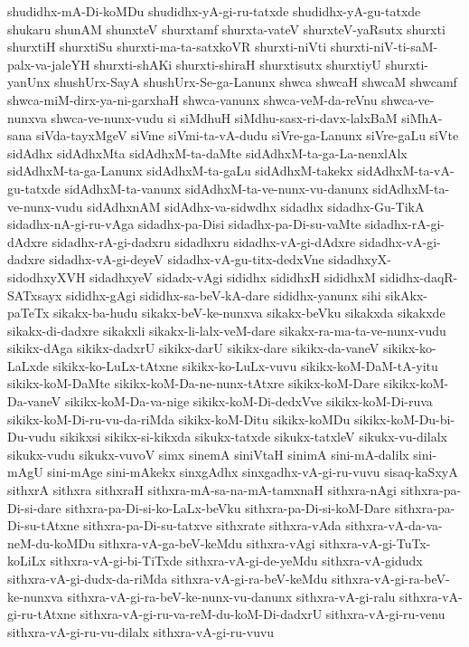 {shudidhx-mA-Di-koMDu
shudidhx-yA-gi-ru-tatxde
shudidhx-yA-gu-tatxde
shukaru
shunAM
shunxteV
shurxtamf
shurxta-vateV
shurxteV-yaRsutx
shurxti
shurxtiH
shurxtiSu
shurxti-ma-ta-satxkoVR
shurxti-niVti
shurxti-niV-ti-saM-palx-va-jaleYH
shurxti-shAKi
shurxti-shiraH
shurxtisutx
shurxtiyU
shurxti-yanUnx
shushUrx-SayA
shushUrx-Se-ga-Lanunx
shwca
shwcaH
shwcaM
shwcamf
shwca-miM-dirx-ya-ni-garxhaH
shwca-vanunx
shwca-veM-da-reVnu
shwca-ve-nunxva
shwca-ve-nunx-vudu
si
siMdhuH
siMdhu-sasx-ri-davx-lalxBaM
siMhA-sana
siVda-tayxMgeV
siVme
siVmi-ta-vA-dudu
siVre-ga-Lanunx
siVre-gaLu
siVte
sidAdhx
sidAdhxMta
sidAdhxM-ta-daMte
sidAdhxM-ta-ga-La-nenxlAlx
sidAdhxM-ta-ga-Lanunx
sidAdhxM-ta-gaLu
sidAdhxM-takekx
sidAdhxM-ta-vA-gu-tatxde
sidAdhxM-ta-vanunx
sidAdhxM-ta-ve-nunx-vu-danunx
sidAdhxM-ta-ve-nunx-vudu
sidAdhxnAM
sidAdhx-va-sidwdhx
sidadhx
sidadhx-Gu-TikA
sidadhx-nA-gi-ru-vAga
sidadhx-pa-Disi
sidadhx-pa-Di-su-vaMte
sidadhx-rA-gi-dAdxre
sidadhx-rA-gi-dadxru
sidadhxru
sidadhx-vA-gi-dAdxre
sidadhx-vA-gi-dadxre
sidadhx-vA-gi-deyeV
sidadhx-vA-gu-titx-dedxVne
sidadhxyX-sidodhxyXVH
sidadhxyeV
sidadx-vAgi
sididhx
sididhxH
sididhxM
sididhx-daqR-SATxsayx
sididhx-gAgi
sididhx-sa-beV-kA-dare
sididhx-yanunx
sihi
sikAkx-paTeTx
sikakx-ba-hudu
sikakx-beV-ke-nunxva
sikakx-beVku
sikakxda
sikakxde
sikakx-di-dadxre
sikakxli
sikakx-li-lalx-veM-dare
sikakx-ra-ma-ta-ve-nunx-vudu
sikikx-dAga
sikikx-dadxrU
sikikx-darU
sikikx-dare
sikikx-da-vaneV
sikikx-ko-LaLxde
sikikx-ko-LuLx-tAtxne
sikikx-ko-LuLx-vuvu
sikikx-koM-DaM-tA-yitu
sikikx-koM-DaMte
sikikx-koM-Da-ne-nunx-tAtxre
sikikx-koM-Dare
sikikx-koM-Da-vaneV
sikikx-koM-Da-va-nige
sikikx-koM-Di-dedxVve
sikikx-koM-Di-ruva
sikikx-koM-Di-ru-vu-da-riMda
sikikx-koM-Ditu
sikikx-koMDu
sikikx-koM-Du-bi-Du-vudu
sikikxsi
sikikx-si-kikxda
sikukx-tatxde
sikukx-tatxleV
sikukx-vu-dilalx
sikukx-vudu
sikukx-vuvoV
simx
sinemA
siniVtaH
sinimA
sini-mA-dalilx
sini-mAgU
sini-mAge
sini-mAkekx
sinxgAdhx
sinxgadhx-vA-gi-ru-vuvu
sisaq-kaSxyA
sithxrA
sithxra
sithxraH
sithxra-mA-sa-na-mA-tamxnaH
sithxra-nAgi
sithxra-pa-Di-si-dare
sithxra-pa-Di-si-ko-LaLx-beVku
sithxra-pa-Di-si-koM-Dare
sithxra-pa-Di-su-tAtxne
sithxra-pa-Di-su-tatxve
sithxrate
sithxra-vAda
sithxra-vA-da-va-neM-du-koMDu
sithxra-vA-ga-beV-keMdu
sithxra-vAgi
sithxra-vA-gi-TuTx-koLiLx
sithxra-vA-gi-bi-TiTxde
sithxra-vA-gi-de-yeMdu
sithxra-vA-gidudx
sithxra-vA-gi-dudx-da-riMda
sithxra-vA-gi-ra-beV-keMdu
sithxra-vA-gi-ra-beV-ke-nunxva
sithxra-vA-gi-ra-beV-ke-nunx-vu-danunx
sithxra-vA-gi-ralu
sithxra-vA-gi-ru-tAtxne
sithxra-vA-gi-ru-va-reM-du-koM-Di-dadxrU
sithxra-vA-gi-ru-venu
sithxra-vA-gi-ru-vu-dilalx
sithxra-vA-gi-ru-vuvu
}
